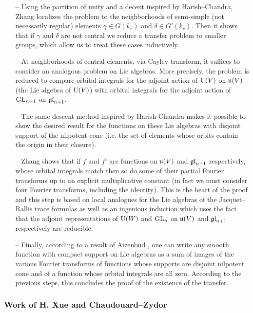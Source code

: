 \begin{itemize}
    \item[--] Using the partition of unity and a decent inspired by Harish--Chandra, Zhang localizes the problem to the neighborhoods of semi-simple (not necessarily regular) elements $\gamma \in G(k_v)$ and $\delta \in G'(k_v)$.
    Then it shows that if $\gamma$ and $\delta$ are not central we reduce a transfer problem to smaller groups, which allow us to treat these cases inductively.

    \item[--] At neighborhoods of central elements, via Cayley transform, it suffices to consider an analogous problem on Lie algebras.
    More precisely, the problem is reduced to compare orbital integrals for the adjoint action of $\mathrm{U}(V)$ on $\mathfrak{u}(V)$ (the Lie algebra of $\mathrm{U}(V)$) with orbital integrals for the adjoint action of $\mathrm{GL}_{n+1}$ on $\mathfrak{gl}_{n+1}$.

    \item[--] The same descent method inspired by Harish-Chandra makes it possible to show the desired result for the functions on these Lie algebras with disjoint support of the nilpotent cone (i.e. the set of elements whose orbits contain the origin in their closure).

    \item[--] Zhang shows that if $f$ and $f'$ are functions on $\mathfrak{u}(V)$ and $\mathfrak{gl}_{n+1}$ respectively, whose orbital integrals match then so do some of their partial Fourier transforms up
    to an explicit multiplicative constant (in fact we must consider four Fourier transforms, including the identity).
    This is the heart of the proof and this step is based on local analogues for the Lie algebras of the Jacquet--Rallis trace formulas as well as an ingenious induction which uses the fact that the adjoint representations of $\mathrm{U}(W)$ and $\mathrm{GL}_n$ on $\mathfrak{u}(V)$ and $\mathfrak{gl}_{n+1}$ respectively are reducible.
    
    \item[--] Finally, according to a result of Aizenbud \cite{aizenbud2013partial}, one can write any smooth function with compact support on Lie algebras as a sum of images of the various Fourier transforms of functions whose supports are disjoint  nilpotent cone and of a function whose orbital integrals are all zero.
    According to the previous steps, this concludes the proof of the existence of the transfer.
\end{itemize}


\subsubsection{Work of H. Xue and Chaudouard--Zydor}

